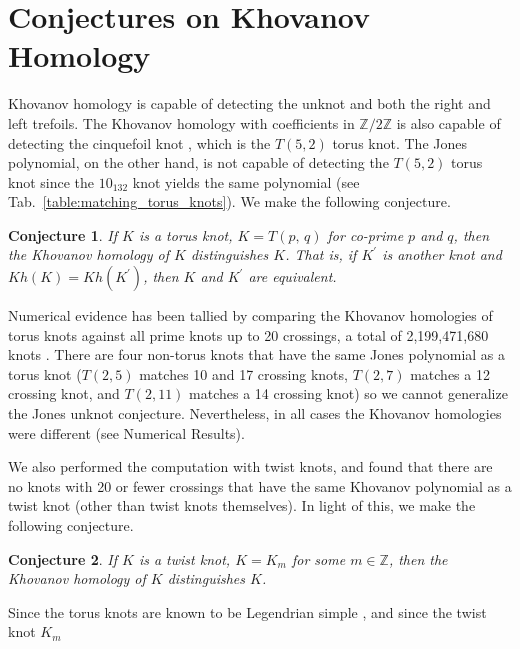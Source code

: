 \documentclass{article}
\theoremstyle{plain}
\newtheorem{conjecture}{Conjecture}
\begin{document}
    \section{Conjectures on Khovanov Homology}
        Khovanov homology is capable of detecting the
        unknot and both the right and left trefoils. The Khovanov homology with
        coefficients in $\mathbb{Z}/2\mathbb{Z}$ is also capable of detecting
        the cinquefoil knot \cite{BaldwinYingSivekCinquefoilKhovanov},
        which is the $T(5,2)$ torus knot. The Jones
        polynomial, on the other hand, is not capable of detecting the
        $T(5,2)$ torus knot since the $10_{132}$ knot yields the same
        polynomial (see Tab.~\ref{table:matching_torus_knots}).
        We make the following conjecture.
        \begin{conjecture}
            If $K$ is a torus knot, $K=T(p,\,q)$ for co-prime $p$ and $q$,
            then the Khovanov homology of $K$ distinguishes $K$. That is, if
            $K^{\prime}$ is another knot and
            $Kh(K)=Kh(K^{\prime})$, then $K$ and $K^{\prime}$ are equivalent.
        \end{conjecture}
        Numerical evidence has been tallied by comparing the Khovanov homologies
        of torus knots  against all prime knots up to 20 crossings, a total of
        2,199,471,680 knots
        \cite{Burton2020TheN3, Thistlethwaite20CrossingKnots}.
        There are four
        non-torus knots that have the same Jones polynomial as a torus knot
        ($T(2,5)$ matches 10 and 17 crossing knots, $T(2,7)$
        matches a 12 crossing knot, and $T(2,11)$ matches a 14 crossing knot)
        so we cannot generalize the Jones unknot conjecture. Nevertheless, in
        all cases the Khovanov homologies were different
        (see Numerical Results).
        \par\hfill\par
        We also performed the computation with twist knots, and found that
        there are no knots with 20 or fewer crossings that have the same
        Khovanov polynomial as a twist knot (other than twist knots themselves).
        In light of this, we make the following conjecture.
        \begin{conjecture}
            If $K$ is a twist knot, $K=K_{m}$ for some $m\in\mathbb{Z}$,
            then the Khovanov homology of $K$ distinguishes $K$.
        \end{conjecture}
        Since the torus knots are known to be Legendrian simple
        \cite{EtnyreHondaContactTopologyI}, and since the twist knot $K_{m}$
\end{document}
